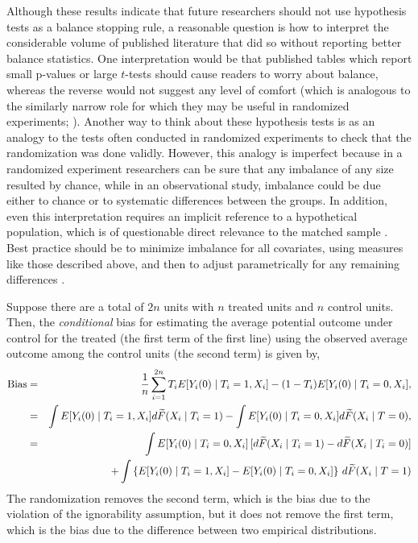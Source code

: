 \documentclass[11pt,titlepage]{article}
\begin{document}
Although these results indicate that future researchers should not use
hypothesis tests as a balance stopping rule, a reasonable question is
how to interpret the considerable volume of published literature that
did so without reporting better balance statistics.  One
interpretation would be that published tables which report small
p-values or large $t$-tests should cause readers to worry about
balance, whereas the reverse would not suggest any level of comfort
(which is analogous to the similarly narrow role for which they may be
useful in randomized experiments; \citealt{Senn94}).  Another way to
think about these hypothesis tests is as an analogy to the tests often
conducted in randomized experiments to check that the randomization
was done validly.  However, this analogy is imperfect because in a
randomized experiment researchers can be sure that any imbalance of
any size resulted by chance, while in an observational study,
imbalance could be due either to chance or to systematic differences
between the groups.  In addition, even this interpretation requires an
implicit reference to a hypothetical population, which is of
questionable direct relevance to the matched sample \citep{Cochran65}.
Best practice should be to minimize imbalance for all covariates,
using measures like those described above, and then to adjust
parametrically for any remaining differences
\citep{Rubin79,RosRub84a,HoImaKin06}.


 Suppose there are a total of $2n$ units
with $n$ treated units and $n$ control units. Then, the {\it
  conditional} bias for estimating the average potential outcome under
control for the treated (the first term of the first line) using the
observed average outcome among the control units (the second term) is
given by,
\begin{eqnarray*}
  {\rm Bias}  & =  & \frac{1}{n} \sum_{i=1}^{2n} T_i E[Y_i(0) \mid
  T_i = 1, X_i] - (1-T_i) E[Y_i(0) \mid T_i = 0, X_i], \\
  & = & \int E[Y_i(0) \mid T_i = 1, X_i] d\widetilde{F}(X_i \mid T_i =
  1) - \int E[Y_i(0) \mid T_i = 0, X_i] d\widetilde{F}(X_i \mid T =
  0), \\
  & = & \int E[Y_i(0) \mid T_i = 0, X_i] \,[d\widetilde{F}(X_i \mid T_i
  = 1) - d\widetilde{F}(X_i \mid T_i = 0)] \\
   &  & + \int\left\{ E[Y_i(0) \mid T_i = 1, X_i] - E[Y_i(0) \mid T_i = 0,
  X_i]\right\}\, d\widetilde{F}(X_i \mid T = 1)
\end{eqnarray*}
The randomization removes the second term, which is the bias due to
the violation of the ignorability assumption, but it does not remove
the first term, which is the bias due to the difference between two
empirical distributions. 

\clearpage


\end{document}
